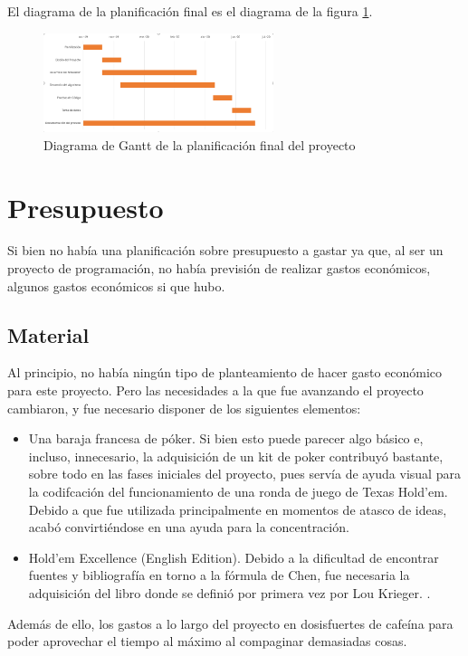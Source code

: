 El diagrama de la planificación final es el diagrama de la figura \ref{fig:gant2}.

\begin{figure}[tb]
\centering
\includegraphics[width=0.6\textwidth]{figuras/gant2.png}   
\caption{Diagrama de Gantt de la planificación final del proyecto}
\label{fig:gant2}
\end{figure}

\section{Presupuesto}

Si bien no había una planificación sobre presupuesto a gastar ya que, al ser un proyecto de programación, no había previsión de realizar gastos económicos, algunos gastos económicos si que hubo.

\subsection{Material}
Al principio, no había ningún tipo de planteamiento de hacer gasto económico para este proyecto. Pero las necesidades a la que fue avanzando el proyecto cambiaron, y fue necesario disponer de los siguientes elementos:
\begin{itemize}
\item Una baraja francesa de póker. Si bien esto puede parecer algo básico e, incluso, innecesario, la adquisición de un kit de poker contribuyó bastante, sobre todo en las fases iniciales del proyecto, pues servía de ayuda visual para la codifcación del funcionamiento de una ronda de juego de Texas Hold'em. Debido a que fue utilizada principalmente en momentos de atasco de ideas, acabó convirtiéndose en una ayuda para la concentración.
\item Hold'em Excellence (English Edition). Debido a la dificultad de encontrar fuentes y bibliografía en torno a la fórmula de Chen, fue necesaria la adquisición del libro donde se definió por primera vez por Lou Krieger. \cite{krieger}.
\end{itemize}

Además de ello, los gastos a lo largo del proyecto en dosisfuertes de cafeína para poder aprovechar el tiempo al máximo al compaginar demasiadas cosas.

